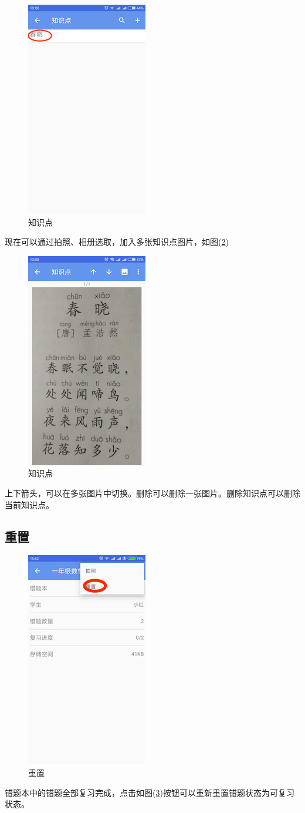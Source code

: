 \begin{figure}[H]
	\centering
	\includegraphics{img/39.png}
	\caption{知识点}
	\label{img39}
\end{figure}
现在可以通过拍照、相册选取，加入多张知识点图片，如图(\ref{img40})
\begin{figure}[H]
	\centering
	\includegraphics{img/40.png}
	\caption{知识点}
	\label{img40}
\end{figure}
上下箭头，可以在多张图片中切换。删除可以删除一张图片。删除知识点可以删除当前知识点。

\subsection{重置}
\begin{figure}[H]
	\centering
	\includegraphics{img/26.png}
	\caption{重置}
	\label{img26}
\end{figure}
错题本中的错题全部复习完成，点击如图(\ref{img26})按钮可以重新重置错题状态为可复习状态。